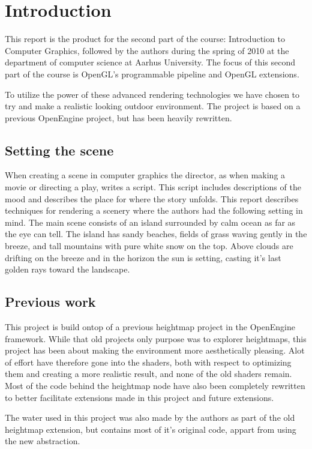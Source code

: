 
\chapter{Introduction}
This report is the product for the second part of the course:
Introduction to Computer Graphics, followed by the authors during the
spring of 2010 at the department of computer science at Aarhus
University. The focus of this second part of the course is OpenGL's
programmable pipeline and OpenGL extensions.

To utilize the power of these advanced rendering technologies we have
chosen to try and make a realistic looking outdoor environment. The
project is based on a previous OpenEngine project, but has been
heavily rewritten.


\section{Setting the scene}
When creating a scene in computer graphics the director, as when
making a movie or directing a play, writes a script. This script
includes descriptions of the mood and describes the place for where
the story unfolds.
%
This report describes techniques for rendering a scenery 
where the authors had the following setting in mind.
%
The main scene consists of an island surrounded by calm ocean as far
as the eye can tell. The island has sandy beaches, fields of grass
waving gently in the breeze, and tall mountains with pure white snow
on the top. Above clouds are drifting on the breeze and in the horizon
the sun is setting, casting it's last golden rays toward the
landscape.

\section{Previous work}
This project is build ontop of a previous heightmap project in the
OpenEngine framework. While that old projects only purpose was to
explorer heightmaps, this project has been about making the
environment more aesthetically pleasing. Alot of effort have therefore
gone into the shaders, both with respect to optimizing them and
creating a more realistic result, and none of the old shaders
remain. Most of the code behind the heightmap node have also been
completely rewritten to better facilitate extensions made in this
project and future extensions.

The water used in this project was also made by the authors as part of
the old heightmap extension, but contains most of it's original code,
appart from using the new  abstraction.

